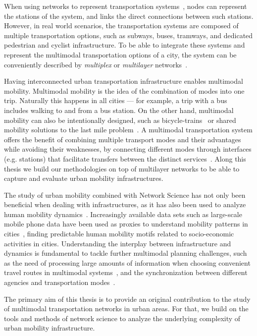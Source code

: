 When using networks to represent transportation systems~\cite{lin2013complex}, nodes can represent the stations of the system, and links the direct connections between such stations. However, in real world scenarios, the transportation systems are composed of multiple transportation options, such as subways, buses, tramways, and dedicated pedestrian and cyclist infrastructure. To be able to integrate these systems and represent the multimodal transportation options of a city, the system can be conveniently described by \textit{multiplex} or \textit{multilayer} networks~\cite{dedomenico2013mathematical,kivela2014multilayer,boccaletti2014structure,battiston2014structural}. 

Having interconnected urban transportation infrastructure enables multimodal mobility. Multimodal mobility is the idea of the combination of modes into one trip. Naturally this happens in all cities — for example, a trip with a bus includes walking to and from a bus station. On the other hand, multimodal mobility can also be intentionally designed, such as bicycle-trains~\cite{geurs2016multi} or shared mobility solutions to the last mile problem~\cite{shaheen2016mobility}. A multimodal transportation system offers the benefit of combining multiple transport modes and their advantages while avoiding their weaknesses, by connecting different modes through interfaces (e.g. stations) that facilitate transfers between the distinct services~\cite{vannes2002design}. Along this thesis we build our methodologies on top of multilayer networks to be able to capture and evaluate urban mobility infrastructures.

The study of urban mobility combined with Network Science has not only been beneficial when dealing with infrastructures, as it has also been used to analyze human mobility dynamics~\cite{barbosa2018human}. Increasingly available data sets such as large-scale mobile phone data have been used as proxies to understand mobility patterns in cities~\cite{gonzalez2008understanding}, finding predictable human mobility motifs related to socio-economic activities in cities. Understanding the interplay between infrastructure and dynamics is fundamental to tackle further multimodal planning challenges, such as the need of processing large amounts of information when choosing convenient travel routes in multimodal systems~\cite{gallotti2016limits}, and the synchronization between different agencies and transportation modes~\cite{barthelemy2016structure}.

\begin{tcolorbox}[colback=white]
The primary aim of this thesis is to provide an original contribution to the study of multimodal transportation networks in urban areas. For that, we build on the tools and methods of network science to analyze the underlying complexity of urban mobility infrastructure.
\end{tcolorbox}

